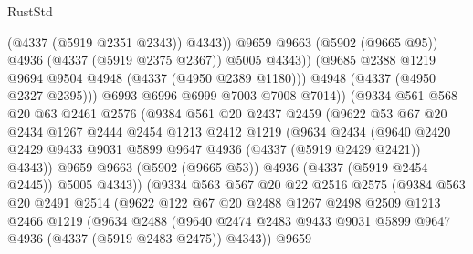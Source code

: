 \begin{lexlean}{RustStd}
\begin{coremodule}
                          (@4337 (@5919 @2351 @2343))
                          @4343))
                      @9659
                      @9663
                      (@5902 (@9665 @95))
                      @4936
                      (@4337 (@5919 @2375 @2367))
                      @5005
                      @4343))
                  (@9685 @2388 @1219 @9694 @9504 @4948 (@4337 (@4950 @2389 @1180)))
                  @4948
                  (@4337 (@4950 @2327 @2395)))
                @6993
                @6996
                @6999
                @7003
                @7008
                @7014))
            (@9334
              @561
              @568
              @20
              @63
              @2461
              @2576
              (@9384
                @561
                @20
                @2437
                @2459
                (@9622
                  @53
                  @67
                  @20
                  @2434
                  @1267
                  @2444
                  @2454
                  @1213
                  @2412
                  @1219
                  (@9634
                    @2434
                    (@9640
                      @2420
                      @2429
                      @9433
                      @9031
                      @5899
                      @9647
                      @4936
                      (@4337 (@5919 @2429 @2421))
                      @4343))
                  @9659
                  @9663
                  (@5902 (@9665 @53))
                  @4936
                  (@4337 (@5919 @2454 @2445))
                  @5005
                  @4343))
              (@9334
                @563
                @567
                @20
                @22
                @2516
                @2575
                (@9384
                  @563
                  @20
                  @2491
                  @2514
                  (@9622
                    @122
                    @67
                    @20
                    @2488
                    @1267
                    @2498
                    @2509
                    @1213
                    @2466
                    @1219
                    (@9634
                      @2488
                      (@9640
                        @2474
                        @2483
                        @9433
                        @9031
                        @5899
                        @9647
                        @4936
                        (@4337 (@5919 @2483 @2475))
                        @4343))
                    @9659

\end{coremodule}
\end{lexlean}
